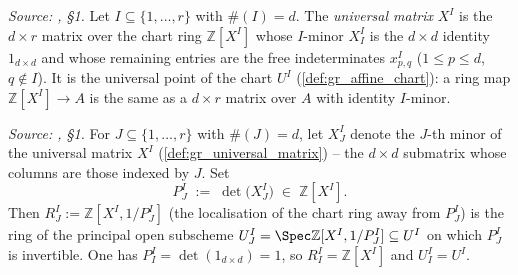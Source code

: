 \begin{definition}\leanok
  \label{def:gr_universal_matrix}
  \textit{Source: \cite{nitsure-hilbert-quot}, \S 1.}
  Let \(I \subseteq \{1,\dots,r\}\) with \(\#(I) = d\). The \emph{universal
  matrix} \(X^I\) is the \(d \times r\) matrix over the chart ring
  \(\mathbb{Z}[X^I]\) whose \(I\)-minor \(X^I_I\) is the \(d \times d\) identity
  \(1_{d\times d}\) and whose remaining entries are the free indeterminates
  \(x^I_{p,q}\) (\(1 \le p \le d\), \(q \notin I\)). It is the universal point of
  the chart \(U^I\) (\cref{def:gr_affine_chart}): a ring map
  \(\mathbb{Z}[X^I] \to A\) is the same as a \(d \times r\) matrix over \(A\)
  with identity \(I\)-minor.
\end{definition}

\begin{definition}\leanok
  \label{def:gr_minor_det}
  \textit{Source: \cite{nitsure-hilbert-quot}, \S 1.}
  For \(J \subseteq \{1,\dots,r\}\) with \(\#(J) = d\), let \(X^I_J\) denote the
  \(J\)-th minor of the universal matrix \(X^I\) (\cref{def:gr_universal_matrix})
  -- the \(d \times d\) submatrix whose columns are those indexed by \(J\). Set
  \[
    P^I_J \;:=\; \det\bigl(X^I_J\bigr) \;\in\; \mathbb{Z}[X^I].
  \]
  Then \(R^I_J := \mathbb{Z}[X^I, 1/P^I_J]\) (the localisation of the chart ring
  away from \(P^I_J\)) is the ring of the principal open subscheme
  \(U^I_J = \Spec \mathbb{Z}[X^I, 1/P^I_J] \subseteq U^I\) on which \(P^I_J\) is
  invertible. One has \(P^I_I = \det(1_{d\times d}) = 1\), so \(R^I_I =
  \mathbb{Z}[X^I]\) and \(U^I_I = U^I\).
\end{definition}

